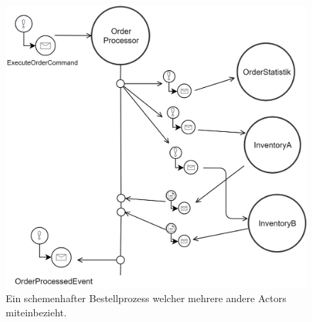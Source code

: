 \begin{figure}
    \centering
    \includegraphics[width=\linewidth]{gfx/actor/patterns/simpleOrderProcesor}
    \caption{Ein schemenhafter Bestellprozess welcher mehrere andere Actors miteinbezieht.}
    \label{fig:actor:patterns:orderProcesseor}
\end{figure}

